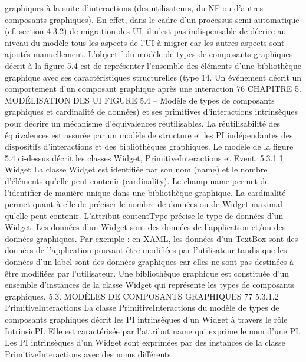 \documentclass{article}
\begin{document}
graphiques \`{a} la suite d’interactions (des utilisateurs, du NF ou d’autres composants graphiques). En
effet, dans le cadre d’un processus semi automatique (cf. section 4.3.2) de migration des UI, il n’est
pas indispensable de d\'{e}crire au niveau du mod\`{e}le tous les aspects de l’UI \`{a} migrer car les autres
aspects sont ajout\'{e}s manuellement.
L’objectif du mod\`{e}le de types de composants graphiques d\'{e}crit \`{a} la ﬁgure 5.4 est de repr\'{e}senter
l’ensemble des \'{e}l\'{e}ments d’une biblioth\`{e}que graphique avec ses caract\'{e}ristiques structurelles (type
14. Un \'{e}v\'{e}nement d\'{e}crit un comportement d’un composant graphique apr\`{e}s une interaction
76
CHAPITRE 5. MODÉLISATION DES UI
FIGURE 5.4 – Mod\`{e}le de types de composants graphiques
et cardinalit\'{e} de donn\'{e}es) et ses primitives d’interactions intrins\`{e}ques pour d\'{e}crire un m\'{e}canisme
d’\'{e}quivalences r\'{e}utilisables. La r\'{e}utilisabilit\'{e} des \'{e}quivalences est assur\'{e}e par un mod\`{e}le de structure
et les PI ind\'{e}pendantes des dispositifs d’interactions et des biblioth\`{e}ques graphiques.
Le mod\`{e}le de la ﬁgure 5.4 ci-dessus d\'{e}crit les classes Widget, PrimitiveInteractions et Event.
5.3.1.1
Widget
La classe Widget est identiﬁ\'{e}e par son nom (name) et le nombre d’\'{e}l\'{e}ments qu’elle peut contenir
(cardinality). Le champ name permet de l’identiﬁer de mani\`{e}re unique dans une biblioth\`{e}que graphique. La cardinalit\'{e} permet quant \`{a} elle de pr\'{e}ciser le nombre de donn\'{e}es ou de Widget maximal
qu’elle peut contenir.
L’attribut contentType pr\'{e}cise le type de donn\'{e}es d’un Widget. Les donn\'{e}es d’un Widget sont
des donn\'{e}es de l’application et/ou des donn\'{e}es graphiques. Par exemple : en XAML, les donn\'{e}es
d’un TextBox sont des donn\'{e}es de l’application pouvant \^{e}tre modiﬁ\'{e}es par l’utilisateur tandis que les
donn\'{e}es d’un label sont des donn\'{e}es graphiques car elles ne sont pas destin\'{e}es \`{a} \^{e}tre modiﬁ\'{e}es par
l’utilisateur.
Une biblioth\`{e}que graphique est constitu\'{e}e d’un ensemble d’instances de la classe Widget qui repr\'{e}sente les types de composants graphiques.
5.3. MODÈLES DE COMPOSANTS GRAPHIQUES
77
5.3.1.2
PrimitiveInteractions
La classe PrimitiveInteractions du mod\`{e}le de types de composants graphiques d\'{e}crit les PI intrins\`{e}ques d’un Widget \`{a} travers le r\^{o}le IntrinsicPI. Elle est caract\'{e}ris\'{e}e par l’attribut name qui exprime
le nom d’une PI.
Les PI intrins\`{e}ques d’un Widget sont exprim\'{e}es par des instances de la classe PrimitiveInteractions avec des noms diff\'{e}rents.
\end{document}
